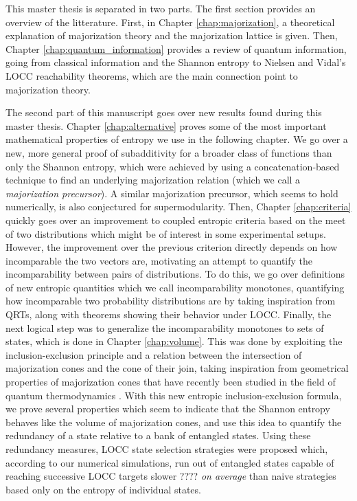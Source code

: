 This master thesis is separated in two parts. The first section provides an overview of the litterature. First, in Chapter \ref{chap:majorization}, a theoretical explanation of majorization theory and the majorization lattice is given. Then, Chapter \ref{chap:quantum_information} provides a review of quantum information, going from classical information and the Shannon entropy to Nielsen and Vidal's LOCC reachability theorems, which are the main connection point to majorization theory.

The second part of this manuscript goes over new results found during this master thesis. Chapter \ref{chap:alternative} proves some of the most important mathematical properties of entropy we use in the following chapter. We go over a new, more general proof of subadditivity for a broader class of functions than only the Shannon entropy, which were achieved by using a concatenation-based technique to find an underlying majorization relation (which we call a \textit{majorization precursor}). A similar majorization precursor, which seems to hold numerically, is also conjectured for supermodularity. Then, Chapter \ref{chap:criteria} quickly goes over an improvement to coupled entropic criteria based on the meet of two distributions which might be of interest in some experimental setups. However, the improvement over the previous criterion directly depends on how incomparable the two vectors are, motivating an attempt to quantify the incomparability between pairs of distributions. To do this, we go over definitions of new entropic quantities which we call incomparability monotones, quantifying how incomparable two probability distributions are by taking inspiration from QRTs, along with theorems showing their behavior under LOCC. Finally, the next logical step was to generalize the incomparability monotones to sets of states, which is done in Chapter \ref{chap:volume}. This was done by exploiting the inclusion-exclusion principle and a relation between the intersection of majorization cones and the cone of their join, taking inspiration from geometrical properties of majorization cones that have recently been studied in the field of quantum thermodynamics \cite{junior_geometric_2022}. With this new entropic inclusion-exclusion formula, we prove several properties which seem to indicate that the Shannon entropy behaves like the volume of majorization cones, and use this idea to quantify the redundancy of a state relative to a bank of entangled states. Using these redundancy measures, LOCC state selection strategies were proposed which, according to our numerical simulations, run out of entangled states capable of reaching successive LOCC targets slower ???? \textit{on average} than naive strategies based only on the entropy of individual states.
